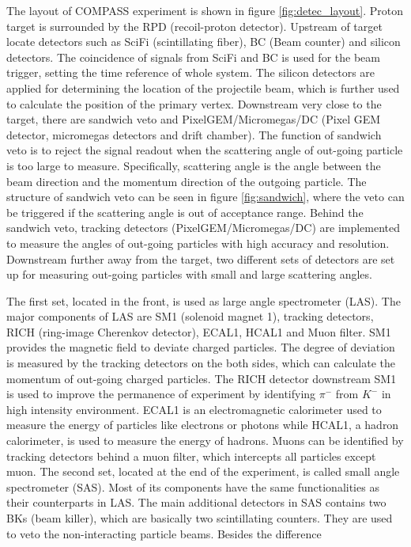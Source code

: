 The layout of COMPASS experiment is shown in figure \ref{fig:detec_layout}. Proton target is surrounded by the RPD (recoil-proton detector). Upstream of target locate detectors such as SciFi (scintillating fiber), BC (Beam counter) and silicon detectors. The coincidence of signals from SciFi and BC is used for the beam trigger, setting the time reference of whole system. The silicon detectors are applied for determining the location of the projectile beam, which is further used to calculate the position of the primary vertex. Downstream very close to the target, there are sandwich veto and PixelGEM/Micromegas/DC (Pixel GEM detector, micromegas detectors and drift chamber). The function of sandwich veto is to reject the signal readout when the scattering angle of out-going particle is too large to measure. Specifically, scattering angle is the angle between the beam direction and the momentum direction of the outgoing particle. The structure of sandwich veto can be seen in figure \ref{fig:sandwich}, where the veto can be triggered if the scattering angle is out of acceptance range. Behind the sandwich veto, tracking detectors (PixelGEM/Micromegas/DC) are implemented to measure the angles of out-going particles with high accuracy and resolution. Downstream further away from the target, two different sets of detectors are set up for measuring out-going particles with small and large scattering angles. 

The first set, located in the front, is used as large angle spectrometer (LAS). The major components of LAS are SM1 (solenoid magnet 1), tracking detectors, RICH (ring-image Cherenkov detector), ECAL1, HCAL1 and Muon filter. SM1 provides the magnetic field to deviate charged particles. The degree of deviation is measured by the tracking detectors on the both sides, which can calculate the momentum of out-going charged particles. The RICH detector downstream SM1 is used to improve the permanence of experiment by identifying $\pi^-$ from $K^-$ in high intensity environment\cite{RICH}. ECAL1 is an electromagnetic calorimeter used to measure the energy of particles like electrons or photons while HCAL1, a hadron calorimeter, is used to measure the energy of hadrons. Muons can be identified by tracking detectors behind a muon filter, which intercepts all particles except muon. The second set, located at the end of the experiment, is called small angle spectrometer (SAS). Most of its components have the same functionalities as their counterparts in LAS. The main additional detectors in SAS contains two BKs (beam killer), which are basically two scintillating counters. They are used to veto the non-interacting particle beams\cite{sandwich}. Besides the difference 




